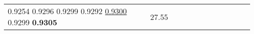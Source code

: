 \documentclass[runningheads]{llncs}
\begin{document}
\begin{table}[!ht]
\begin{tabular}{|p{7em}|p{2.5em}|p{2.5em}|p{3em}|p{2.5em}|p{3em}|p{2.5em}|p{3em}|p{2.5em}|p{3em}|p{2.5em}|p{3em}|}
{}0.9254 \newline{}0.9296 \newline{}0.9299 \newline{}0.9292 \newline{}\underline{0.9300} \newline{}0.9299 \newline{}\bfseries{0.9305} & 27.55 
\end{tabular}
\end{table}
\end{document}
